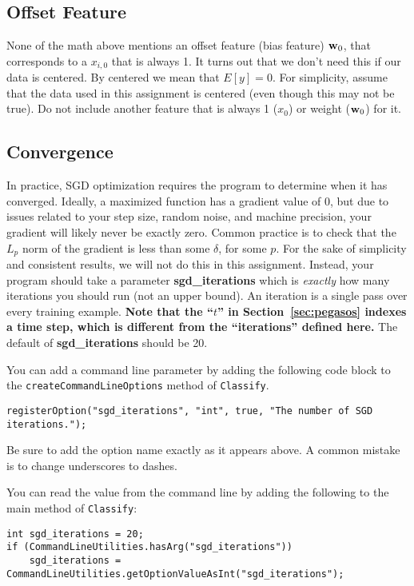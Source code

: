 \documentclass[11pt]{article}
\newcommand{\vw}{{\bf w}}
\begin{document}
\subsection{Offset Feature}
None of the math above mentions an offset feature (bias feature) $\vw_0$, that corresponds to a $x_{i,0}$ that is always 1. It turns out that we don't need this if our data is centered. By centered we mean that $E[y] = 0$. For simplicity, assume that the data used in this assignment is centered (even though this may not be true). Do not include another feature that is always 1 ($x_0$) or weight ($\vw_0$) for it.

\subsection{Convergence}
In practice, SGD optimization requires the program to determine when it has converged. Ideally, a maximized function has a gradient value of 0, but due to issues related to your step size, random noise, and machine precision, your gradient will likely never be exactly zero. Common practice is to check that the $L_p$ norm of the gradient is less than some $\delta$, for some $p$. For the sake of simplicity and consistent results, we will not do this in this assignment. Instead, your program should take a parameter \textbf{sgd\_iterations} which is \emph{exactly} how many iterations you should run (not an upper bound). An iteration is a single pass over every training example. \textbf{Note that the ``$t$'' in Section~\ref{sec:pegasos} indexes a time step, which is different from the ``iterations'' defined here.}
The default of \textbf{sgd\_iterations} should be 20.

You can add a command line parameter by adding the following code block to the {\tt createCommandLineOptions} method of {\tt Classify}.
\begin{footnotesize}
\begin{verbatim}
registerOption("sgd_iterations", "int", true, "The number of SGD iterations.");
\end{verbatim}
\end{footnotesize}

Be sure to add the option name exactly as it appears above. A common mistake is to change underscores to dashes.

You can read the value from the command line by adding the following to the main method of {\tt Classify}:
\begin{footnotesize}
\begin{verbatim}
int sgd_iterations = 20;
if (CommandLineUtilities.hasArg("sgd_iterations"))
    sgd_iterations = CommandLineUtilities.getOptionValueAsInt("sgd_iterations");
\end{verbatim}

\end{footnotesize}
\end{document}
